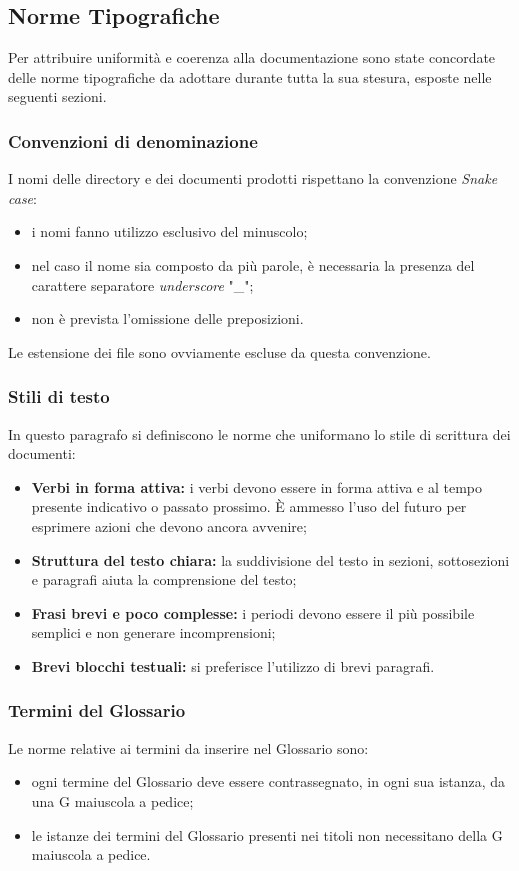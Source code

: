 \subsection{Norme Tipografiche}
\label{sec:NormeTipografiche}
Per attribuire uniformità e coerenza alla documentazione sono state concordate  delle norme tipografiche da adottare durante tutta la sua stesura, esposte nelle seguenti sezioni.
\subsubsection{Convenzioni di denominazione}
I nomi delle directory e dei documenti prodotti rispettano la convenzione \textit{Snake case}:%
\begin{itemize}
  \item i nomi fanno utilizzo esclusivo del minuscolo;
  \item nel caso il nome sia composto da più parole, è necessaria la presenza del carattere separatore \textit{underscore} "\_";
  \item non è prevista l'omissione delle preposizioni.
\end{itemize}
Le estensione dei file sono ovviamente escluse da questa convenzione.
\subsubsection{Stili di testo}
In questo paragrafo si definiscono le norme che uniformano lo stile di scrittura dei documenti:
\begin{itemize}
\item \textbf{Verbi in forma attiva:} i verbi devono essere in forma attiva e al tempo presente indicativo o passato prossimo. È ammesso l'uso del futuro per esprimere azioni che devono ancora avvenire;
\item \textbf{Struttura del testo chiara:} la suddivisione del testo in sezioni, sottosezioni e paragrafi aiuta la comprensione del testo;
\item \textbf{Frasi brevi e poco complesse:} i periodi devono essere il più possibile semplici e non generare incomprensioni;
\item \textbf{Brevi blocchi testuali:} si preferisce l'utilizzo di brevi paragrafi.
\end{itemize}
\subsubsection{Termini del Glossario}
Le norme relative ai termini da inserire nel Glossario sono: 
\begin{itemize}
\item ogni termine del Glossario deve essere contrassegnato, in ogni sua istanza, da una G maiuscola a pedice; 
	\item le istanze dei termini del Glossario presenti nei titoli non necessitano della G maiuscola a pedice. 
\end{itemize}
